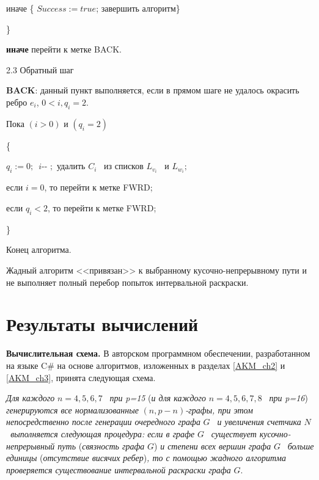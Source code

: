 иначе \{ $\mathit{Success}:=\mathit{true}$; завершить алгоритм\}

\}

\textbf{иначе} перейти к метке \foreignlanguage{english}{BACK}.

2.3 Обратный шаг

\foreignlanguage{english}{\textbf{BACK}}: данный пункт выполняется, если в прямом шаге не удалось окрасить ребро  $e_i$,
$0<i,q_i=2.$

Пока $(i>0)$ и $(q_i=2)$

\{

$q_i:=0;$\  $i${}-{}- $;$ удалить  $C_i$ \ из списков  $L_{v_i}$ \ и  $L_{w_i};$

если  $i=0$, то перейти к метке \foreignlanguage{english}{FWRD};

если  $q_i<2$, то перейти к метке \foreignlanguage{english}{FWRD};

\}

Конец алгоритма.

\begin{remark}\label{AKM_ch1_r2}
	Жадный алгоритм <<привязан>> к выбранному кусочно-непрерывному пути и не выполняет полный перебор попыток
	интервальной раскраски.
\end{remark}

\section{Результаты вычислений}\label{AKM_ch1_6}
\hypertarget{Toc503377127}{}\textbf{Вычислительная схема. }В авторском программном обеспечении, разработанном на языке
\foreignlanguage{english}{C}\# на основе алгоритмов, изложенных в разделах \ref{AKM_ch2} и \ref{AKM_ch3}, принята следующая схема.

\textit{Для каждого } $n=4,5,6,7$ \textit{\ при }\foreignlanguage{english}{\textit{p}}\textit{=15 }(\textit{и для
	каждого } $n=4,5,6,7,8$ \textit{\ при }\foreignlanguage{english}{\textit{p}}\textit{=16})\textit{ генерируются все
	нормализованные } $(n,p-n)$\textit{{}-графы, при этом непосредственно после генерации очередного графа } $G$
\textit{\ и увеличения счетчика } $N$ \textit{\ выполняется следующая процедура: если в графе } $G$
\textit{\ существует кусочно-непрерывный путь }(\textit{связность графа } $G$)\textit{ и степени всех вершин графа }
$G$ \textit{\ больше единицы }(\textit{отсутствие висячих ребер})\textit{, то с помощью жадного алгоритма проверяется
	существование интервальной раскраски графа } $G$.

